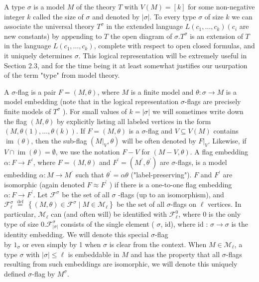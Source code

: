 \documentclass[10pt]{article}
\begin{document}
A type $\sigma$ is a model $M$ of the theory $T$ with $V(M)=[k]$ for some non-negative integer $k$ called the size of $\sigma$ and denoted by $|\sigma|$. To every type $\sigma$ of size $k$ we can associate the universal theory $T^{\sigma}$ in the extended language $L\left(c_{1}, \ldots, c_{k}\right)\left(c_{i}\right.$ are new constants) by appending to $T$ the open diagram of $\sigma . T^{\sigma}$ is an extension of $T$ in the language $L\left(c_{1}, \ldots, c_{k}\right)$, complete with respect to open closed formulas, and it uniquely determines $\sigma$. This logical representation will be extremely useful in Section 2.3, and for the time being it at least somewhat justifies our usurpation of the term "type" from model theory.

A $\sigma$-flag is a pair $F=(M, \theta)$, where $M$ is a finite model and $\theta: \sigma \longrightarrow M$ is a model embedding (note that in the logical representation $\sigma$-flags are precisely finite models of $T^{\sigma}$ ). For small values of $k=|\sigma|$ we will sometimes write down the flag $(M, \theta)$ by explicitly listing all labeled vertices in the form $(M, \theta(1), \ldots, \theta(k))$. If $F=(M, \theta)$ is a $\sigma$-flag and $V \subseteq V(M)$ contains $\operatorname{im}(\theta)$, then the sub-flag $\left(\left.M\right|_{V}, \theta\right)$ will be often denoted by $\left.F\right|_{V}$. Likewise, if $V \cap \operatorname{im}(\theta)=\emptyset$, we use the notation $F-V$ for $(M-V, \theta)$. A flag embedding $\alpha: F \longrightarrow F^{\prime}$, where $F=(M, \theta)$ and $F^{\prime}=\left(M^{\prime}, \theta^{\prime}\right)$ are $\sigma$-flags, is a model embedding $\alpha: M \longrightarrow M^{\prime}$ such that $\theta^{\prime}=\alpha \theta$ ("label-preserving"). $F$ and $F^{\prime}$ are isomorphic (again denoted $F \approx F^{\prime}$ ) if there is a one-to-one flag embedding $\alpha: F \longrightarrow F^{\prime}$. Let $\mathcal{F}^{\sigma}$ be the set of all $\sigma$ -flags (up to an isomorphism), and $\mathcal{F}_{\ell}^{\sigma} \stackrel{\text { def }}{=}\left\{(M, \theta) \in \mathcal{F}^{\sigma} \mid M \in \mathcal{M}_{\ell}\right\}$ be the set of all $\sigma$-flags on $\ell$ vertices. In particular, $\mathcal{M}_{\ell}$ can (and often will) be identified with $\mathcal{F}_{\ell}^{0}$, where 0 is the only type of size $0 . \mathcal{F}_{|\sigma|}^{\sigma}$ consists of the single element ( $\sigma$, id), where id : $\sigma \longrightarrow \sigma$ is the identity embedding. We will denote this special $\sigma$-flag\\
by $1_{\sigma}$ or even simply by 1 when $\sigma$ is clear from the context. When $M \in \mathcal{M}_{\ell}$, a type $\sigma$ with $|\sigma| \leq \ell$ is embeddable in $M$ and has the property that all $\sigma$-flags resulting from such embeddings are isomorphic, we will denote this uniquely defined $\sigma$-flag by $M^{\sigma}$.
\end{document}
